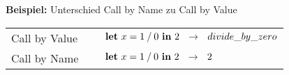 {
  {\bf Beispiel:} Unterschied Call by Name zu Call by Value\\[5mm]
  \begin{tabular}{ll}
     Call by Value $\quad$      & $\bli{x}{\infix{/}{1}{0}}{2} \ \ \to \ \ divide\_by\_zero$ \\[3mm]
     Call by Name $\quad$       & $\bli{x}{\infix{/}{1}{0}}{2} \ \ \to \ \ 2$ \\[3mm]
  \end{tabular}
}